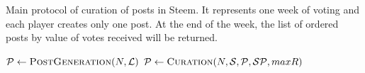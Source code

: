     \begin{algorithm}[H]
      \caption{Main protocol of curation of posts in Steem. It represents one
      week of voting and each player creates only one post. At the end of the
      week, the list of ordered posts by value of votes received will be
      returned.}
      \label{alg:Protocol}
      \begin{algorithmic}[1]
        \State $\mathcal{P} \leftarrow \textsc{PostGeneration}(N,\mathcal{L})$
        \State $\mathcal{P} \leftarrow
        \textsc{Curation}(N,\mathcal{S},\mathcal{P},\mathcal{SP}, maxR)$
        \State {}
      \EndFunction
      \end{algorithmic}
    \end{algorithm}
